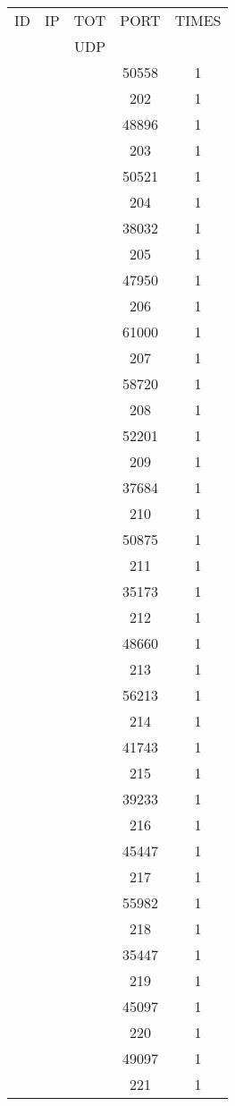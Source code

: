 \documentclass[a4paper]{scrartcl}
\begin{document}
\begin{minipage}[b]{0.5\linewidth}
\begin{tabular}{| c | c | c | c | c |}
\hline
ID & IP & TOT & PORT & TIMES \\ 
   &    & UDP &      &       \\ 
\hline
& & & 50558 & 1 \\ & & & 202 & 1 \\ & & & 48896 & 1 \\ & & & 203 & 1 \\ & & & 50521 & 1 \\ & & & 204 & 1 \\ & & & 38032 & 1 \\ & & & 205 & 1 \\ & & & 47950 & 1 \\ & & & 206 & 1 \\ & & & 61000 & 1 \\ & & & 207 & 1 \\ & & & 58720 & 1 \\ & & & 208 & 1 \\ & & & 52201 & 1 \\ & & & 209 & 1 \\ & & & 37684 & 1 \\ & & & 210 & 1 \\ & & & 50875 & 1 \\ & & & 211 & 1 \\ & & & 35173 & 1 \\ & & & 212 & 1 \\ & & & 48660 & 1 \\ & & & 213 & 1 \\ & & & 56213 & 1 \\ & & & 214 & 1 \\ & & & 41743 & 1 \\ & & & 215 & 1 \\ & & & 39233 & 1 \\ & & & 216 & 1 \\ & & & 45447 & 1 \\ & & & 217 & 1 \\ & & & 55982 & 1 \\ & & & 218 & 1 \\ & & & 35447 & 1 \\ & & & 219 & 1 \\ & & & 45097 & 1 \\ & & & 220 & 1 \\ & & & 49097 & 1 \\ & & & 221 & 1 \\ \hline\end{tabular}\end{minipage} \hfill\begin{minipage}[b]{0.5\linewidth}\begin{tabular}{| c | c | c | c | c |}

\end{tabular}
\end{minipage}
\end{document}
